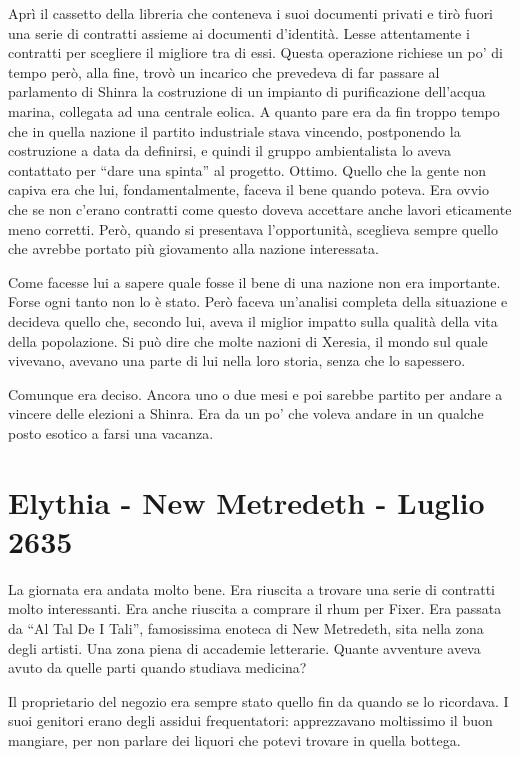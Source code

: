     Aprì il cassetto della libreria che conteneva i suoi documenti privati
    e tirò fuori una serie di contratti assieme ai documenti d'identità.
    Lesse attentamente i contratti per scegliere il migliore tra di essi.
    Questa operazione richiese un po' di tempo però, alla fine, trovò un
    incarico che prevedeva di far passare al parlamento di Shinra la
    costruzione di un impianto di purificazione dell'acqua marina,
    collegata ad una centrale eolica. A quanto pare era da fin troppo
    tempo che in quella nazione il partito industriale stava vincendo,
    postponendo la costruzione a data da definirsi, e quindi il gruppo
    ambientalista lo aveva contattato per ``dare una spinta'' al progetto.
    Ottimo. Quello che la gente non capiva era che lui, fondamentalmente,
    faceva il bene quando poteva. Era ovvio che se non c'erano contratti
    come questo doveva accettare anche lavori eticamente meno corretti.
    Però, quando si presentava l'opportunità, sceglieva sempre quello che
    avrebbe portato più giovamento alla nazione interessata.

    Come facesse lui a sapere quale fosse il bene di una nazione non era
    importante. Forse ogni tanto non lo è stato. Però faceva un'analisi
    completa della situazione e decideva quello che, secondo lui, aveva il
    miglior impatto sulla qualità della vita della popolazione. Si può dire
    che molte nazioni di Xeresia, il mondo sul quale vivevano, avevano una
    parte di lui nella loro storia, senza che lo sapessero.

    Comunque era deciso. Ancora uno o due mesi e poi sarebbe partito per
    andare a vincere delle elezioni a Shinra. Era da un po' che voleva
    andare in un qualche posto esotico a farsi una vacanza.

  \section{Elythia - New Metredeth - Luglio 2635}
    
    La giornata era andata molto bene. Era riuscita a trovare una serie di
    contratti molto interessanti. Era anche riuscita a comprare il rhum per
    Fixer. Era passata da ``Al Tal De I Tali'', famosissima enoteca di New
    Metredeth, sita nella zona degli artisti. Una zona piena di accademie
    letterarie. Quante avventure aveva avuto da quelle parti quando
    studiava medicina?

    Il proprietario del negozio era sempre stato quello fin da quando se lo
    ricordava. I suoi genitori erano degli assidui frequentatori:
    apprezzavano moltissimo il buon mangiare, per non parlare dei liquori
    che potevi trovare in quella bottega.

